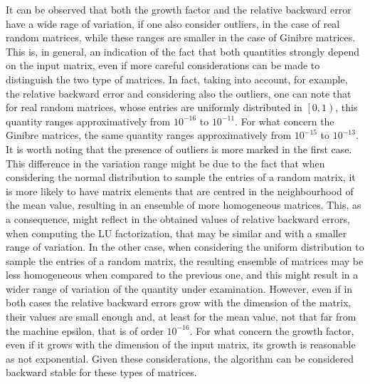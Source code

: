 \documentclass[a4paper,11pt]{article}
\begin{document}
\noindent It can be observed that both the growth factor and the relative backward error have a wide rage of variation, if one also consider outliers, in the case of real random matrices, while these ranges are smaller in the case of Ginibre matrices. This is, in general, an indication of the fact that both quantities strongly depend on the input matrix, even if more careful considerations can be made to distinguish the two type of matrices. In fact, taking into account, for example, the relative backward error and considering also the outliers, one can note that for real random matrices, whose entries are uniformly distributed in $\left[0,1\right)$, this quantity ranges approximatively from $10^{-16}$ to $10^{-11}$. For what concern the Ginibre matrices, the same quantity ranges approximatively from $10^{-15}$ to $10^{-13}$. It is worth noting that the presence of outliers is more marked in the first case.
This difference in the variation range might be due to the fact that when considering the normal distribution to sample the entries of a random matrix, it is more likely to have matrix elements that are centred in the neighbourhood of the mean value, resulting in an ensemble of more homogeneous matrices. This, as a consequence, might reflect in the obtained values of relative backward errors, when computing the LU factorization, that may be similar and with a smaller range of variation. In the other case, when considering the uniform distribution to sample the entries of a random matrix, the resulting ensemble of matrices may be less homogeneous when compared to the previous one, and this might result in a wider range of variation of the quantity under examination. However, even if in both cases the relative backward errors grow with the dimension of the matrix, their values are small enough and, at least for the mean value, not that far from the machine epsilon, that is of order $10^{-16}$. For what concern the growth factor, even if it grows with the dimension of the input matrix, its growth is reasonable as not exponential. Given these considerations, the algorithm can be considered backward stable for these types of matrices.\\
\end{document}
